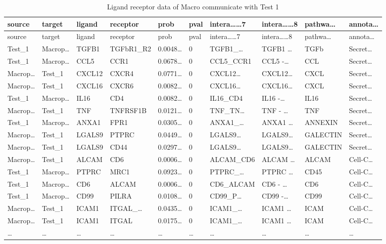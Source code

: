 \documentclass[
]{article}
\begin{document}
\begin{longtable}[]{@{}llllllllll@{}}
\caption{\label{tab:Ligand-receptor-data-of-Macro-communicate-with-Test-1}Ligand receptor data of Macro communicate with Test 1}\tabularnewline
\toprule
source & target & ligand & receptor & prob & pval & intera\ldots\ldots7 & intera\ldots\ldots8 & pathwa\ldots{} & annota\ldots{}\tabularnewline
\midrule
\endfirsthead
\toprule
source & target & ligand & receptor & prob & pval & intera\ldots\ldots7 & intera\ldots\ldots8 & pathwa\ldots{} & annota\ldots{}\tabularnewline
\midrule
\endhead
Test\_1 & Macrop\ldots{} & TGFB1 & TGFbR1\_R2 & 0.0048\ldots{} & 0 & TGFB1\_\ldots{} & TGFB1 \ldots{} & TGFb & Secret\ldots{}\tabularnewline
Test\_1 & Macrop\ldots{} & CCL5 & CCR1 & 0.0678\ldots{} & 0 & CCL5\_CCR1 & CCL5 -\ldots{} & CCL & Secret\ldots{}\tabularnewline
Macrop\ldots{} & Test\_1 & CXCL12 & CXCR4 & 0.0771\ldots{} & 0 & CXCL12\ldots{} & CXCL12\ldots{} & CXCL & Secret\ldots{}\tabularnewline
Macrop\ldots{} & Test\_1 & CXCL16 & CXCR6 & 0.0082\ldots{} & 0 & CXCL16\ldots{} & CXCL16\ldots{} & CXCL & Secret\ldots{}\tabularnewline
Test\_1 & Macrop\ldots{} & IL16 & CD4 & 0.0082\ldots{} & 0 & IL16\_CD4 & IL16 -\ldots{} & IL16 & Secret\ldots{}\tabularnewline
Macrop\ldots{} & Test\_1 & TNF & TNFRSF1B & 0.0121\ldots{} & 0 & TNF\_TN\ldots{} & TNF - \ldots{} & TNF & Secret\ldots{}\tabularnewline
Test\_1 & Macrop\ldots{} & ANXA1 & FPR1 & 0.0305\ldots{} & 0 & ANXA1\_\ldots{} & ANXA1 \ldots{} & ANNEXIN & Secret\ldots{}\tabularnewline
Macrop\ldots{} & Test\_1 & LGALS9 & PTPRC & 0.0449\ldots{} & 0 & LGALS9\ldots{} & LGALS9\ldots{} & GALECTIN & Secret\ldots{}\tabularnewline
Macrop\ldots{} & Test\_1 & LGALS9 & CD44 & 0.0297\ldots{} & 0 & LGALS9\ldots{} & LGALS9\ldots{} & GALECTIN & Secret\ldots{}\tabularnewline
Macrop\ldots{} & Test\_1 & ALCAM & CD6 & 0.0006\ldots{} & 0 & ALCAM\_CD6 & ALCAM \ldots{} & ALCAM & Cell-C\ldots{}\tabularnewline
Test\_1 & Macrop\ldots{} & PTPRC & MRC1 & 0.0923\ldots{} & 0 & PTPRC\_\ldots{} & PTPRC \ldots{} & CD45 & Cell-C\ldots{}\tabularnewline
Test\_1 & Macrop\ldots{} & CD6 & ALCAM & 0.0006\ldots{} & 0 & CD6\_ALCAM & CD6 - \ldots{} & CD6 & Cell-C\ldots{}\tabularnewline
Test\_1 & Macrop\ldots{} & CD99 & PILRA & 0.0108\ldots{} & 0 & CD99\_P\ldots{} & CD99 -\ldots{} & CD99 & Cell-C\ldots{}\tabularnewline
Macrop\ldots{} & Test\_1 & ICAM1 & ITGAL\_\ldots{} & 0.0435\ldots{} & 0 & ICAM1\_\ldots{} & ICAM1 \ldots{} & ICAM & Cell-C\ldots{}\tabularnewline
Macrop\ldots{} & Test\_1 & ICAM1 & ITGAL & 0.0175\ldots{} & 0 & ICAM1\_\ldots{} & ICAM1 \ldots{} & ICAM & Cell-C\ldots{}\tabularnewline
\ldots{} & \ldots{} & \ldots{} & \ldots{} & \ldots{} & \ldots{} & \ldots{} & \ldots{} & \ldots{} & \ldots{}\tabularnewline
\bottomrule
\end{longtable}
\end{document}
